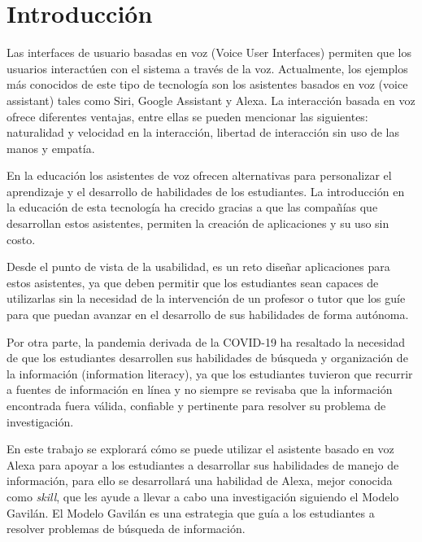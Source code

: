 
\chapter{Introducción}
\label{capI}



Las interfaces de usuario basadas en voz (Voice User Interfaces) permiten que los usuarios interactúen con el sistema a través de la voz. Actualmente, los ejemplos más conocidos de este tipo de tecnología son los asistentes basados en voz (voice assistant) tales como Siri, Google Assistant y Alexa. La interacción basada en voz ofrece diferentes ventajas, entre ellas se pueden mencionar las siguientes: naturalidad y velocidad en la interacción, libertad de interacción sin uso de las manos y empatía.

En la educación los asistentes de voz ofrecen alternativas para personalizar el aprendizaje y el desarrollo de habilidades de los estudiantes. La introducción en la educación de esta tecnología ha crecido gracias a que las compañías que desarrollan estos asistentes, permiten la creación de aplicaciones y su uso sin costo.

Desde el punto de vista de la usabilidad, es un reto diseñar aplicaciones para estos asistentes, ya que deben permitir que los estudiantes sean capaces de utilizarlas sin la necesidad de la intervención de un profesor o tutor que los guíe para que puedan avanzar en el desarrollo de sus habilidades de forma autónoma.

Por otra parte, la pandemia derivada de la COVID-19 ha resaltado la necesidad de que los estudiantes desarrollen sus habilidades de búsqueda y organización de la información (information literacy), ya que los estudiantes tuvieron que recurrir a fuentes de información en línea y no siempre se revisaba que la información encontrada fuera válida, confiable y pertinente para resolver su problema de investigación. 

En este trabajo se explorará cómo se puede utilizar el asistente basado en voz Alexa para apoyar a los estudiantes a desarrollar sus habilidades de manejo de información, para ello se desarrollará una habilidad de Alexa, mejor conocida como \textit{skill}, que les ayude a llevar a cabo una investigación siguiendo el Modelo Gavilán. El Modelo Gavilán es una estrategia que guía a los estudiantes a resolver problemas de búsqueda de información.

